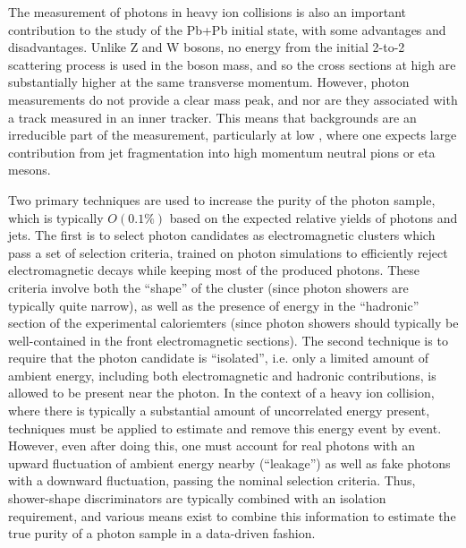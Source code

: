 The measurement of photons in heavy ion collisions is also an important contribution to the
study of the Pb+Pb initial state, with some advantages and disadvantages.  Unlike Z and W bosons, 
no energy from the initial 2-to-2 scattering process is used in the boson mass, 
and so the cross sections at high \pT are substantially higher at the same transverse momentum.
However, photon measurements do not provide a clear mass peak, and nor are they associated with
a track measured in an inner tracker.  This means that backgrounds are an irreducible part of
the measurement, particularly at low \pT, where one expects large contribution from jet fragmentation
into high momentum neutral pions or eta mesons.

Two primary techniques are used to increase the purity of the photon sample, which is typically
$O(0.1\%)$ based on the expected relative yields of photons and jets.  The first is to select
photon candidates as electromagnetic clusters which pass a set of selection criteria, trained on
photon simulations to efficiently reject electromagnetic decays while keeping most of the
produced photons.  These criteria involve both the ``shape'' of the cluster (since photon showers
are typically quite narrow), as well as the presence of energy in the ``hadronic'' section of the
experimental caloriemters (since photon showers should typically be well-contained in the front
electromagnetic sections).
The second technique is to require that the photon candidate is ``isolated'', i.e. only a limited
amount of ambient energy, including both electromagnetic and hadronic contributions, 
is allowed to be present near the photon.  In the context of a heavy ion collision, where there
is typically a substantial amount of uncorrelated energy present, techniques must be applied to
estimate and remove this energy event by event.  However, even after doing this, one must account
for real photons with an upward fluctuation of ambient energy nearby (``leakage'') as well
as fake photons with a downward fluctuation, passing the nominal selection criteria. 
Thus, shower-shape discriminators are typically combined with an isolation requirement, and various
means exist to combine this information to estimate the true purity of a photon sample in a 
data-driven fashion.

